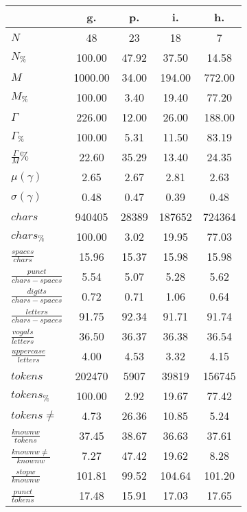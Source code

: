 \begin{table}[h!]
\begin{center}
\begin{tabular}{| l || c | c | c | c |}\hline
 & {\bf g.} & {\bf p.} & {\bf i.} & {\bf h.} \\\hline\hline
$N$ & 48  & 23  & 18  & 7 \\
$N_{\%}$ & 100.00  & 47.92  & 37.50  & 14.58 \\\hline
$M$ & 1000.00  & 34.00  & 194.00  & 772.00 \\
$M_{\%}$ & 100.00  & 3.40  & 19.40  & 77.20 \\\hline
$\Gamma$ & 226.00  & 12.00  & 26.00  & 188.00 \\
$\Gamma_{\%}$ & 100.00  & 5.31  & 11.50  & 83.19 \\\hline
$\frac{\Gamma}{M}\%$ & 22.60  & 35.29  & 13.40  & 24.35 \\
$\mu(\gamma)$ & 2.65  & 2.67  & 2.81  & 2.63 \\
$\sigma(\gamma)$ & 0.48  & 0.47  & 0.39  & 0.48 \\\hline\hline
$chars$ & 940405  & 28389  & 187652  & 724364 \\
$chars_{\%}$ & 100.00  & 3.02  & 19.95  & 77.03 \\\hline
$\frac{spaces}{chars}$ & 15.96  & 15.37  & 15.98  & 15.98 \\
$\frac{punct}{chars-spaces}$ & 5.54  & 5.07  & 5.28  & 5.62 \\
$\frac{digits}{chars-spaces}$ & 0.72  & 0.71  & 1.06  & 0.64 \\\hline
$\frac{letters}{chars-spaces}$ & 91.75  & 92.34  & 91.71  & 91.74 \\
$\frac{vogals}{letters}$ & 36.50  & 36.37  & 36.38  & 36.54 \\
$\frac{uppercase}{letters}$ & 4.00  & 4.53  & 3.32  & 4.15 \\\hline\hline
$tokens$ & 202470  & 5907  & 39819  & 156745 \\
$tokens_{\%}$ & 100.00  & 2.92  & 19.67  & 77.42 \\
$tokens \neq$ & 4.73  & 26.36  & 10.85  & 5.24 \\\hline
$\frac{knownw}{tokens}$ & 37.45  & 38.67  & 36.63  & 37.61 \\
$\frac{knownw \neq}{knownw}$ & 7.27  & 47.42  & 19.62  & 8.28 \\\hline
$\frac{stopw}{knownw}$ & 101.81  & 99.52  & 104.64  & 101.20 \\
$\frac{punct}{tokens}$ & 17.48  & 15.91  & 17.03  & 17.65 \\

\end{tabular}
\end{center}
\end{table}
